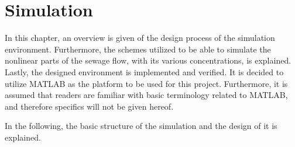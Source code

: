 \chapter{Simulation}\label{ch:simulation}
In this chapter, an overview is given of the design process of the simulation environment. Furthermore, the schemes utilized to be able to simulate the nonlinear parts of the sewage flow, with its various concentrations, is explained. Lastly, the designed environment is implemented and verified. It is decided to utilize MATLAB as the platform to be used for this project. Furthermore, it is assumed that readers are familiar with basic terminology related to MATLAB, and therefore specifics will not be given hereof.

In the following, the basic structure of the simulation and the design of it is explained.